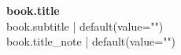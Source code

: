 \documentclass[{{ output.fontsize | default(value="12") }}pt,a5paper,openany]{memoir}
\title{\I {{book.title}}}
\newcommand\I[0]{%
  \ignorespaces
}
\begin{document}
\frontmatter
\begin{titlingpage}
  \begin{vplace}[0.5]
    \begin{center}
      \Huge{\textbf{\I {{ book.title }}}} \\
      \vspace{0.5cm}
      \LARGE{\I {{ book.subtitle | default(value="") }}} \\
      \vspace{10cm}
      \small{\I {{ book.title_note | default(value="") }}}
    \end{center}
  \end{vplace}
\end{titlingpage}

\tableofcontents*

\mainmatter
\pagestyle{songs}
\end{document}
